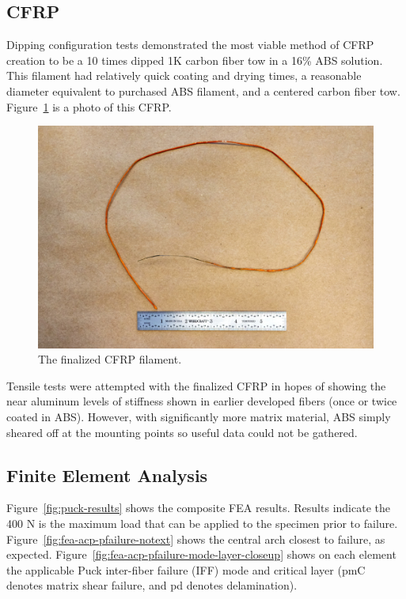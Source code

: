 
\hfill \vspace{-20pt}

\subsection*{CFRP}

Dipping configuration tests demonstrated the most viable method of CFRP creation to be a 10 times dipped 1K carbon fiber tow in a 16\% ABS solution. This filament had relatively quick coating and drying times, a reasonable diameter equivalent to purchased ABS filament, and a centered carbon fiber tow. Figure~\ref{fig:filament-dipping-dried} is a photo of this CFRP.

\begin{figure}[t]
\centering
\includegraphics[width=0.8\linewidth]{./figures/filament-dipping-dried}
\caption{The finalized CFRP filament.}
\label{fig:filament-dipping-dried}
\end{figure}

Tensile tests were attempted with the finalized CFRP in hopes of showing the near aluminum levels of stiffness shown in earlier developed fibers (once or twice coated in ABS). However, with significantly more matrix material, ABS simply sheared off at the mounting points so useful data could not be gathered.

\subsection*{Finite Element Analysis}

Figure~\ref{fig:puck-results} shows the composite FEA results. Results indicate the 400 N is the maximum load that can be applied to the specimen prior to failure. Figure~\ref{fig:fea-acp-pfailure-notext} shows the central arch closest to failure, as expected. Figure~\ref{fig:fea-acp-pfailure-mode-layer-closeup} shows on each element the applicable Puck inter-fiber failure (IFF) mode and critical layer (pmC denotes matrix shear failure, and pd denotes delamination).


